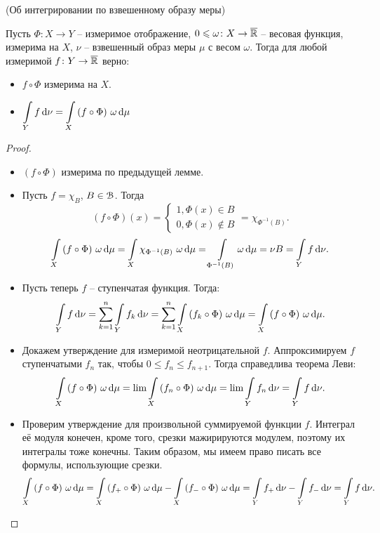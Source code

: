 \begin{theorem}(Об интегрировании по взвешенному образу меры)
    
    Пусть $\Phi \colon X \to Y$ -- измеримое отображение, $0 \leqslant 
    \omega \colon X \to \overline{\mathbb{R}}$ -- весовая функция, измерима на $X$, 
    $\nu$ -- взвешенный образ меры $\mu$ с весом $\omega$.
    Тогда для любой измеримой $f \colon Y \to \overline{\mathbb{R}}$ верно:
    \begin{itemize}
        \item $f \circ \Phi$ измерима на $X$.
        \item $\displaystyle \int\limits_{Y}{f \,\mathrm{d}\nu} = \int\limits_{X}{(f \circ \Phi)~ \omega \,\mathrm{d}\mu}$
    \end{itemize} 
\end{theorem}
\begin{proof}
    \enewline
    \begin{itemize}
        \item $(f \circ \Phi)$ измерима по предыдущей лемме. 
        \item Пусть $f = \chi_B$, $B \in \mathcal{B}$. Тогда
            \[
                (f \circ \Phi)(x) = \begin{cases}
                    1, \Phi(x) \in B \\
                    0, \Phi(x) \notin B
                \end{cases} = \chi_{\Phi^{-1}(B)}
            .\]
            \[
                \int\limits_X{(f \circ \Phi)~\omega \,\mathrm{d}\mu} = \int\limits_X{\chi_{\Phi^{-1}(B)}~\omega \,\mathrm{d}\mu} =
                \int\limits_{\Phi^{-1}(B)}{\omega \,\mathrm{d}\mu} = \nu{B} = \int\limits_Y{f \,\mathrm{d}\nu}
            .\]
        \item Пусть теперь $f$ -- ступенчатая функция. Тогда:
            \[
                \int\limits_Y{f \,\mathrm{d}\nu} = \sum_{k = 1}^n{\int\limits_Y{f_k \,\mathrm{d}\nu}} = 
                \sum_{k = 1}^n{\int\limits_X{(f_k \circ \Phi)~\omega \,\mathrm{d}\mu}} = \int\limits_X{(f \circ \Phi)~\omega \,\mathrm{d}\mu}
            .\]
        \item Докажем утверждение для измеримой неотрицательной $f$. Аппроксимируем $f$ ступенчатыми
        $f_n$ так, чтобы $0 \leqslant f_n \leqslant f_{n+1}$. Тогда справедлива теорема Леви:
            \[
                \int\limits_X{(f \circ \Phi)~\omega \,\mathrm{d}\mu} = \lim{\int\limits_X{(f_n \circ \Phi)~\omega \,\mathrm{d}\mu}} =
                \lim{\int\limits_Y{f_n \,\mathrm{d}\nu}} = \int\limits_Y{f \,\mathrm{d}\nu}
            .\]
        \item Проверим утверждение для произвольной суммируемой функции $f$. Интеграл её модуля конечен,
            кроме того, срезки мажирируются модулем, поэтому их интегралы тоже конечны. Таким образом,
            мы имеем право писать все формулы, использующие срезки.
            \[
                \int\limits_X{(f \circ \Phi)~\omega \,\mathrm{d}\mu} = \int\limits_X{(f_+ \circ \Phi)~\omega \,\mathrm{d}\mu} -
                \int\limits_X{(f_- \circ \Phi)~\omega \,\mathrm{d}\mu} = \int\limits_Y{f_+ \,\mathrm{d}\nu} - \int\limits_Y{f_- \,\mathrm{d}\nu} 
                = \int\limits_Y{f \,\mathrm{d}\nu}
            .\]
    \end{itemize}
\end{proof}

